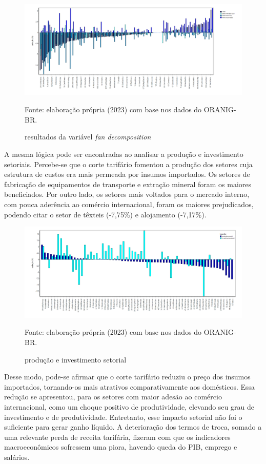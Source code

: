 \begin{figure}[h]
	\centering
	\includegraphics[width=\linewidth]{Imagens/006.png}
	\caption{resultados da variável \textit{fan decomposition}}
	\label{fig:fandecomp}
	\footnotesize
	Fonte: elaboração própria (2023) com base nos dados do ORANIG-BR.
\end{figure}

A mesma lógica pode ser encontradas ao analisar a produção e investimento setoriais. Percebe-se que o corte tarifário fomentou a produção dos setores cuja estrutura de custos era mais permeada por insumos importados. Os setores de fabricação de equipamentos de transporte e extração mineral foram os maiores beneficiados. Por outro lado, os setores mais voltados para o mercado interno, com pouca aderência ao comércio internacional, foram os maiores prejudicados, podendo citar o setor de têxteis (-7,75\%) e alojamento (-7,17\%). 

\begin{figure}[h]
	\centering
	\includegraphics[width=\linewidth]{Imagens/007.png}
	\caption{produção e investimento setorial}
	\label{fig:x1x2}
	\footnotesize
	Fonte: elaboração própria (2023) com base nos dados do ORANIG-BR.
\end{figure}

Desse modo, pode-se afirmar que o corte tarifário reduziu o preço dos insumos importados, tornando-os mais atrativos comparativamente aos domésticos. Essa redução se apresentou, para os setores com maior adesão ao comércio internacional, como um choque positivo de produtividade, elevando seu grau de investimento e de produtividade. Entretanto, esse impacto setorial não foi o suficiente para gerar ganho líquido. A deterioração dos termos de troca, somado a uma relevante perda de receita tarifária, fizeram com que os indicadores macroeconômicos sofressem uma piora, havendo queda do PIB, emprego e salários.


